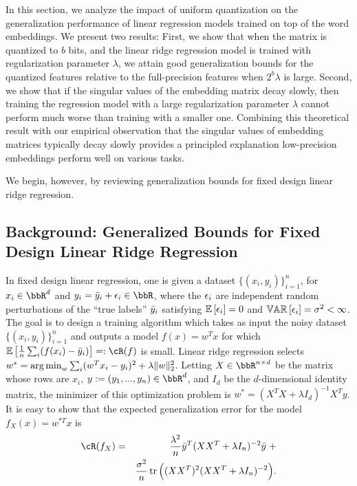 In this section, we analyze the impact of uniform quantization on the generalization performance of linear regression models trained on top of the word embeddings.
We present two results:
First, we show that when the matrix is quantized to $b$ bits, and the linear ridge regression model is trained with regularization parameter $\lambda$, we attain good generalization bounds for the quantized features relative to the full-precision features when $2^b \lambda$ is large.
Second, we show that if the singular values of the embedding matrix decay slowly, then training the regression model with a large regularization parameter $\lambda$ cannot perform much worse than training with a smaller one.
Combining this theoretical result with our empirical observation that the singular values of embedding matrices typically decay slowly provides a principled explanation low-precision embeddings perform well on various tasks.

We begin, however, by reviewing generalization bounds for fixed design linear ridge regression.

\subsection{Background: Generalized Bounds for Fixed Design Linear Ridge Regression}
In fixed design linear regression, one is given a dataset $\{(x_i,y_i)\}_{i=1}^n$, for $x_i \in \RR^d$ and $y_i = \by_i + \eps_i \in \RR$, where the $\eps_i$ are independent random perturbations of the ``true labels'' $\by_i$ satisfying $\expect{}{\eps_i} = 0$ and $\var{}{\eps_i} = \sigma^2 < \infty$.
The goal is to design a training algorithm which takes as input the noisy dataset $\{(x_i,y_i)\}_{i=1}^n$ and outputs a model $f(x) = w^T x$ for which $\expect{}{\frac{1}{n}\sum_i (f(x_i) -\by_i)} \eqdef \cR(f)$ is small.
Linear ridge regression selects $w^* = \argmin_w \sum_i (w^T x_i - y_i)^2 + \lambda\|w\|_2^2$.
Letting $X \in \RR^{n\times d}$ be the matrix whose rows are $x_i$, $y \defeq (y_1,...,y_n) \in \RR^d$, and $I_d$ be the $d$-dimensional identity matrix, the minimizer of this optimization problem is $w^* = ( X^T X + \lambda I_d)^{-1}X^Ty$.
It is easy to show \citep{alaoui15} that the expected generalization error for the model $f_X(x) = w^{*T}x$ is
\begin{eqnarray*}
\cR(f_X) &=& \frac{\lambda^2}{n} \by^T(XX^T + \lambda I_n)^{-2}\by \; +\\ && \frac{\sigma^2}{n}\tr\Big((XX^T)^2(XX^T + \lambda I_n)^{-2}\Big).
\end{eqnarray*}

